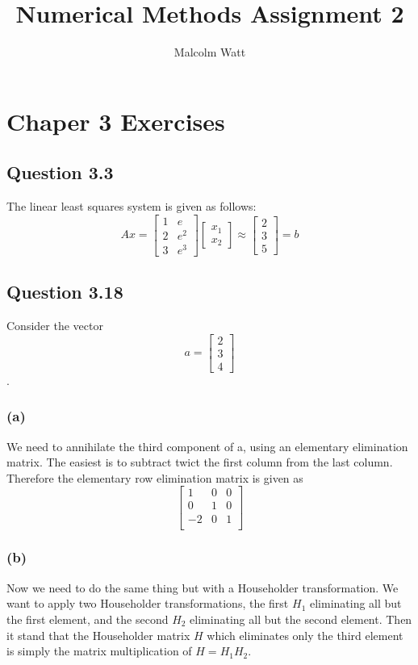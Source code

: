 \documentclass[12pt,a4paper]{report}
\author{Malcolm Watt}
\title{Numerical Methods Assignment 2}
\begin{document}
\maketitle
\section*{Chaper 3 Exercises}
\subsection*{Question 3.3}
The linear least squares system is given as follows:
{\color{blue}
$$A x= 
\begin{bmatrix}
1 & e\\
2 & e^2\\
3 & e^3
\end{bmatrix}
\begin{bmatrix}
x_1 \\ x_2
\end{bmatrix}
\approx
\begin{bmatrix}
2 \\
3 \\
5
\end{bmatrix}
= b
$$
}
\subsection*{Question 3.18}
Consider the vector $$ a = \begin{bmatrix}2\\3\\4\end{bmatrix}$$.
\subsubsection{(a)}
We need to annihilate the third component of a, using an elementary elimination
matrix. The easiest is to subtract twict the first column from the last column.
Therefore the elementary row elimination matrix is given as
{\color{blue}
$$\begin{bmatrix}
1 & 0 & 0\\
0 & 1 & 0\\
-2 & 0 & 1\\
\end{bmatrix}$$
}
\subsubsection{(b)}
Now we need to do the same thing but with a Householder transformation.
We want to apply two Householder transformations, the first $H_1$ eliminating all
but the first element, and the second $H_2$ eliminating all but the second element.
Then it stand that the Householder matrix $H$ which eliminates only the third
element is simply the matrix multiplication of $H = H_1H_2$.
\end{document}

